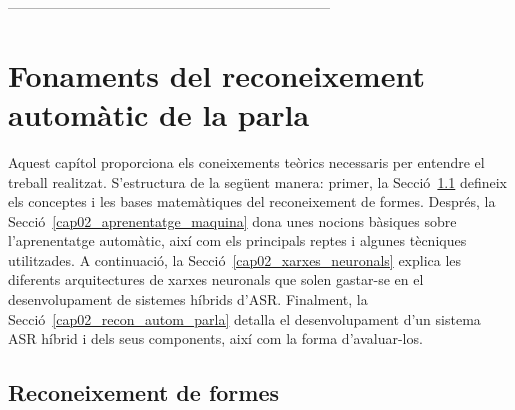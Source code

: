 ---------------------------------------------------------------------

\chapter{Fonaments del reconeixement automàtic de la parla}
\label{cap02__}


Aquest capítol proporciona els coneixements teòrics necessaris per entendre el treball realitzat. S'estructura de la següent manera: 
primer, la Secció~\ref{cap02_reconeixement_patrons} defineix els conceptes i les bases matemàtiques del reconeixement de formes. 
Després, la Secció~\ref{cap02_aprenentatge_maquina} dona unes nocions bàsiques sobre l'aprenentatge automàtic, així com els principals reptes i algunes tècniques utilitzades.
A continuació, la Secció~\ref{cap02_xarxes_neuronals} explica les diferents arquitectures de xarxes neuronals que solen gastar-se en el desenvolupament de sistemes híbrids d'ASR.
Finalment, la Secció~\ref{cap02_recon_autom_parla} detalla el desenvolupament d'un sistema ASR híbrid i dels seus components, així com la forma d'avaluar-los.

\section{Reconeixement de formes}
\label{cap02_reconeixement_patrons}

